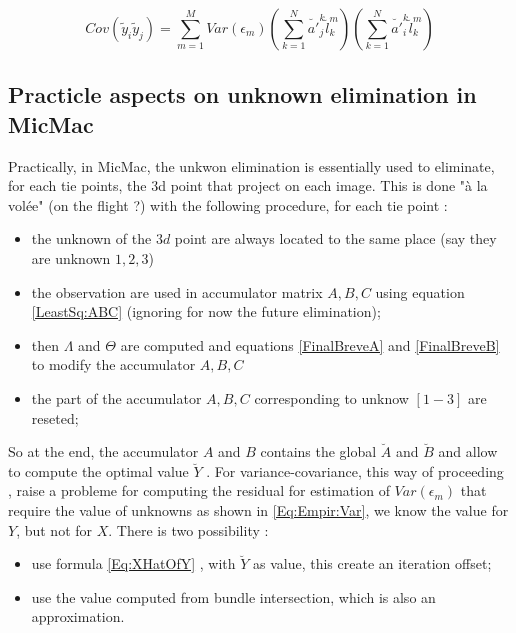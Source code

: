 \begin{equation}
     Cov(\tilde y_i \tilde y_j)  =     \sum\limits_{m=1}^M  Var({\epsilon}_m) 
                         (\sum\limits_{k=1}^N  {\breve {a'}}^k_j   {\breve {l}}^m_k  )
                         (\sum\limits_{k=1}^N  {\breve {a'}}^k_i   {\breve {l}}^m_k  )
\end{equation}

\subsection{Practicle aspects on unknown elimination in MicMac}

Practically, in MicMac, the unkwon elimination is essentially used  to eliminate, for each tie points, 
the $3$d point that project on each image. This is done "\`a la vol\'ee" (on the flight ?) with
the following procedure, for each tie point :

\begin{itemize}
    \item the unknown of the $3d$ point are always located to the same place (say they are unknown $1,2,3$)
    \item the observation are used in accumulator matrix $A,B,C$ using equation \ref{LeastSq:ABC} (ignoring
          for now the future elimination);
    \item  then $\Lambda$ and $\Theta$ are computed and equations \ref{FinalBreveA} and \ref{FinalBreveB} to
           modify the accumulator $A,B,C$
    \item the part of the accumulator $A,B,C$  corresponding to unknow $[1-3]$ are reseted;
\end{itemize}

So at the end, the accumulator $A$ and $B$ contains the  global $\breve A$  and $\breve B$ and allow to
compute the optimal value $\breve Y$ . For variance-covariance,
this way of proceeding ,  raise a probleme for computing the residual for estimation of $Var(\epsilon _m)$  that
require the value of unknowns as shown in \ref{Eq:Empir:Var}, we know the value for $Y$, but not for $X$.
There is two possibility :

\begin{itemize}
   \item  use  formula \ref{Eq:XHatOfY} , with  $\breve Y$  as value, this create an iteration offset;
   \item use the value computed from bundle intersection, which is also an approximation.
\end{itemize}

